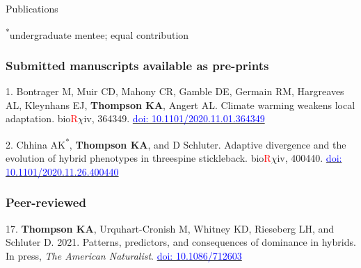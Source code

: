 \documentclass[11pt]{article}
\begin{document}
\noindent\begin{rSection}{Publications}

\textsuperscript{*}undergraduate mentee; \textsuperscript{\dag}equal contribution



\subsubsection*{Submitted manuscripts available as pre-prints}

\noindent\hspace{.1cm}1. Bontrager M, Muir CD, Mahony CR, Gamble DE, Germain RM, Hargreaves AL, Kleynhans EJ, \textbf{Thompson KA}, Angert AL. Climate warming weakens local adaptation. bio\textcolor{red}{R}$\chi$iv, 364349. \href{https://doi.org/10.1101/2020.11.01.364349}{\textcolor{blue}{doi: 10.1101/2020.11.01.364349}} %

\noindent\hspace{.1cm}2. Chhina AK\textsuperscript{*}\textsuperscript{\dag}, \textbf{Thompson KA}\textsuperscript{\dag}, and D Schluter. Adaptive divergence and the evolution of hybrid phenotypes in threespine stickleback. bio\textcolor{red}{R}$\chi$iv, 400440. \href{https://doi.org/10.1101/2020.11.26.400440}{\textcolor{blue}{doi: 10.1101/2020.11.26.400440}} %

\subsubsection*{Peer-reviewed}

\noindent\hspace{.1cm}17. \textbf{Thompson KA}, Urquhart-Cronish M, Whitney KD, Rieseberg LH, and Schluter D. 2021. Patterns, predictors, and consequences of dominance in hybrids. In press, \textit{The American Naturalist}. \href{https://doi.org/10.1086/712603}{\textcolor{blue}{doi: 10.1086/712603}}


\end{rSection}
\end{document}

